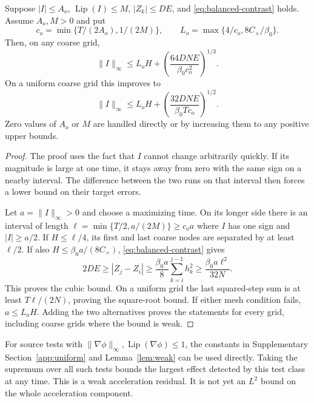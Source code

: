 \begin{lemma}
\label{lem:master-observer}
Suppose $|I|\le A_o$, $\operatorname{Lip}(I)\le M$, $|Z_k|\le DE$,
and \eqref{eq:balanced-contrast} holds. Assume $A_o,M>0$ and put
\[
 c_o=\min\{T/(2A_o),1/(2M)\},\qquad
 L_o=\max\{4/c_o,8C_\times/\beta_0\}.
\]
Then, on any coarse grid,
\begin{equation}
 \|I\|_\infty\le L_oH+
 \left(\frac{64DN E}{\beta_0c_o^2}\right)^{1/3}.
 \label{eq:observer-cube}
\end{equation}
On a uniform coarse grid this improves to
\begin{equation}
 \|I\|_\infty\le L_oH+
 \left(\frac{32DN E}{\beta_0Tc_o}\right)^{1/2}.
 \label{eq:observer-square}
\end{equation}
Zero values of $A_o$ or $M$ are handled directly or by increasing them to
any positive upper bounds.
\end{lemma}
\begin{proof}
The proof uses the fact that $I$ cannot change arbitrarily quickly.
If its magnitude is large at one time, it stays away from zero with the
same sign on a nearby interval. The difference between the two runs on
that interval then forces a lower bound on their target errors.

Let $a=\|I\|_\infty>0$ and choose a maximizing time. On its longer side
there is an interval of length
$\ell=\min\{T/2,a/(2M)\}\ge c_oa$ where $I$ has one sign and
$|I|\ge a/2$. If $H\le\ell/4$, its first and last coarse nodes are
separated by at least $\ell/2$. If also $H\le\beta_0a/(8C_\times)$,
\eqref{eq:balanced-contrast} gives
\[
 2DE\ge |Z_j-Z_i|\ge\frac{\beta_0a}{8}\sum_{k=i}^{j-1}h_k^2
 \ge\frac{\beta_0a\ell^2}{32N}.
\]
This proves the cubic bound. On a uniform grid the last squared-step sum
is at least $T\ell/(2N)$, proving the square-root bound. If either mesh
condition fails, $a\le L_oH$. Adding the two alternatives proves the
statements for every grid, including coarse grids where the bound is weak.
\end{proof}

For source tests with $\|\nabla\phi\|_\infty,
\operatorname{Lip}(\nabla\phi)\le1$, the constants in
Supplementary Section~\ref{app:uniform} and Lemma~\ref{lem:weak} can be used directly.
Taking the supremum over all such tests bounds the largest effect detected
by this test class at any time. This is a weak acceleration residual.
It is not yet an $L^2$ bound on the whole acceleration component.

